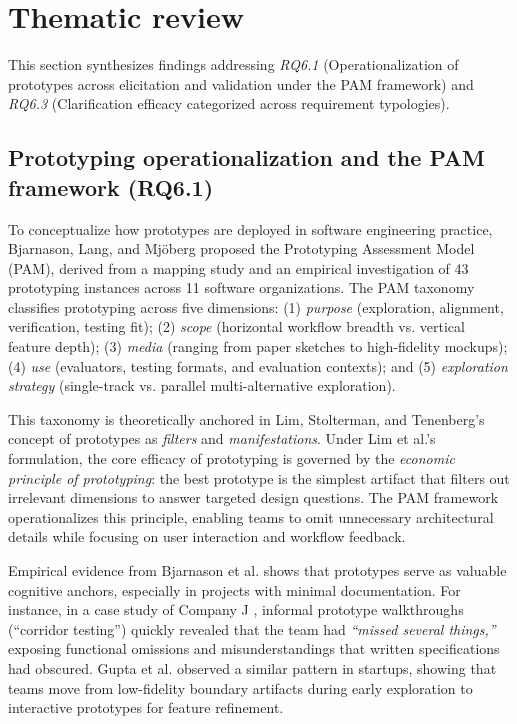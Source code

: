 \section{Thematic review}
\label{sec:thematic}

This section synthesizes findings addressing \textit{RQ6.1} (Operationalization of prototypes across elicitation and validation under the PAM framework) and \textit{RQ6.3} (Clarification efficacy categorized across requirement typologies).

\subsection{Prototyping operationalization and the PAM framework (RQ6.1)}
To conceptualize how prototypes are deployed in software engineering practice, Bjarnason, Lang, and Mj{\"o}berg \cite{bjarnason2023empirically} proposed the Prototyping Assessment Model (PAM), derived from a mapping study and an empirical investigation of 43 prototyping instances across 11 software organizations. The PAM taxonomy classifies prototyping across five dimensions: (1) \textit{purpose} (exploration, alignment, verification, testing fit); (2) \textit{scope} (horizontal workflow breadth vs. vertical feature depth); (3) \textit{media} (ranging from paper sketches to high-fidelity mockups); (4) \textit{use} (evaluators, testing formats, and evaluation contexts); and (5) \textit{exploration strategy} (single-track vs. parallel multi-alternative exploration).

This taxonomy is theoretically anchored in Lim, Stolterman, and Tenenberg's \cite{lim2008anatomy} concept of prototypes as \textit{filters} and \textit{manifestations}. Under Lim et al.'s formulation, the core efficacy of prototyping is governed by the \textit{economic principle of prototyping}: the best prototype is the simplest artifact that filters out irrelevant dimensions to answer targeted design questions. The PAM framework operationalizes this principle, enabling teams to omit unnecessary architectural details while focusing on user interaction and workflow feedback.

Empirical evidence from Bjarnason et al. \cite{bjarnason2023empirically} shows that prototypes serve as valuable cognitive anchors, especially in projects with minimal documentation. For instance, in a case study of Company J \cite{bjarnason2023empirically}, informal prototype walkthroughs (``corridor testing'') quickly revealed that the team had \textit{``missed several things,''} exposing functional omissions and misunderstandings that written specifications had obscured. Gupta et al. \cite{gupta2022strategic} observed a similar pattern in startups, showing that teams move from low-fidelity boundary artifacts during early exploration to interactive prototypes for feature refinement.

